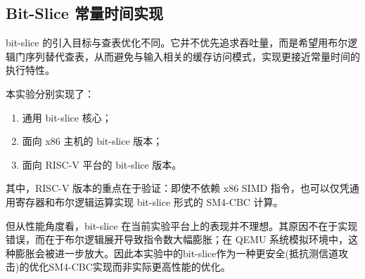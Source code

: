 \subsection{Bit-Slice 常量时间实现}

bit-slice 的引入目标与查表优化不同。它并不优先追求吞吐量，而是希望用布尔逻辑门序列替代查表，从而避免与输入相关的缓存访问模式，实现更接近常量时间的执行特性。

本实验分别实现了：

\begin{enumerate}
    \item 通用 bit-slice 核心；
    \item 面向 x86 主机的 bit-slice 版本；
    \item 面向 RISC-V 平台的 bit-slice 版本。
\end{enumerate}

其中，RISC-V 版本的重点在于验证：即使不依赖 x86 SIMD 指令，也可以仅凭通用寄存器和布尔逻辑运算实现 bit-slice 形式的 SM4-CBC 计算。

但从性能角度看，bit-slice 在当前实验平台上的表现并不理想。其原因不在于实现错误，而在于布尔逻辑展开导致指令数大幅膨胀；在 QEMU 系统模拟环境中，这种膨胀会被进一步放大。因此本实验中的bit-slice作为一种更安全(抵抗测信道攻击)的优化SM4-CBC实现而非实际更高性能的优化。
